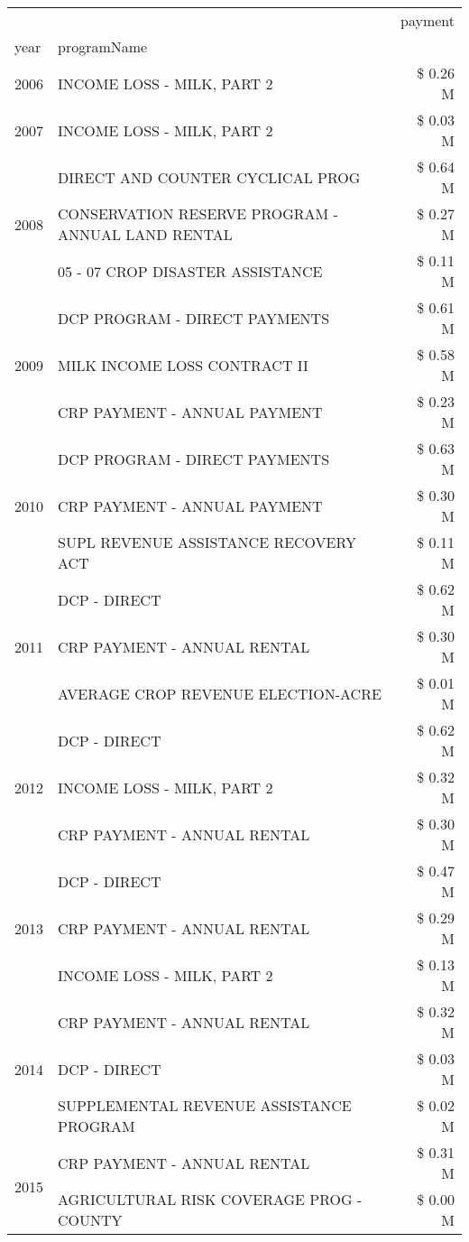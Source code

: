 \begin{tabular}{llr}
\toprule
 &  & payment \\
year & programName &  \\
\midrule
2006 & INCOME LOSS - MILK, PART 2 & \$ 0.26 M \\
\cline{1-3}
2007 & INCOME LOSS - MILK, PART 2 & \$ 0.03 M \\
\cline{1-3}
\multirow[t]{3}{*}{2008} & DIRECT AND COUNTER CYCLICAL PROG & \$ 0.64 M \\
 & CONSERVATION RESERVE PROGRAM - ANNUAL LAND RENTAL & \$ 0.27 M \\
 & 05 - 07 CROP DISASTER ASSISTANCE & \$ 0.11 M \\
\cline{1-3}
\multirow[t]{3}{*}{2009} & DCP PROGRAM - DIRECT PAYMENTS & \$ 0.61 M \\
 & MILK INCOME LOSS CONTRACT II & \$ 0.58 M \\
 & CRP PAYMENT - ANNUAL PAYMENT & \$ 0.23 M \\
\cline{1-3}
\multirow[t]{3}{*}{2010} & DCP PROGRAM - DIRECT PAYMENTS & \$ 0.63 M \\
 & CRP PAYMENT - ANNUAL PAYMENT & \$ 0.30 M \\
 & SUPL REVENUE ASSISTANCE RECOVERY ACT & \$ 0.11 M \\
\cline{1-3}
\multirow[t]{3}{*}{2011} & DCP - DIRECT & \$ 0.62 M \\
 & CRP PAYMENT - ANNUAL RENTAL & \$ 0.30 M \\
 & AVERAGE CROP REVENUE ELECTION-ACRE & \$ 0.01 M \\
\cline{1-3}
\multirow[t]{3}{*}{2012} & DCP - DIRECT & \$ 0.62 M \\
 & INCOME LOSS - MILK, PART 2 & \$ 0.32 M \\
 & CRP PAYMENT - ANNUAL RENTAL & \$ 0.30 M \\
\cline{1-3}
\multirow[t]{3}{*}{2013} & DCP - DIRECT & \$ 0.47 M \\
 & CRP PAYMENT - ANNUAL RENTAL & \$ 0.29 M \\
 & INCOME LOSS - MILK, PART 2 & \$ 0.13 M \\
\cline{1-3}
\multirow[t]{3}{*}{2014} & CRP PAYMENT - ANNUAL RENTAL & \$ 0.32 M \\
 & DCP - DIRECT & \$ 0.03 M \\
 & SUPPLEMENTAL REVENUE ASSISTANCE PROGRAM & \$ 0.02 M \\
\cline{1-3}
\multirow[t]{2}{*}{2015} & CRP PAYMENT - ANNUAL RENTAL & \$ 0.31 M \\
 & AGRICULTURAL RISK COVERAGE PROG - COUNTY & \$ 0.00 M \\

\end{tabular}
